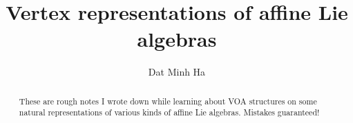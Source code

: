 

\setcounter{section}{-1}


\newcommand{\simpleroots}{\mathbb{I}}



    \title{Vertex representations of affine Lie algebras}
    
    \author{Dat Minh Ha}
    \maketitle
    
    \begin{abstract}
        These are rough notes I wrote down while learning about VOA structures on some natural representations of various kinds of affine Lie algebras. Mistakes guaranteed!
    \end{abstract}
    
    {
    \hypersetup{} 
    \tableofcontents %
    }

    

    

    

    
    
    \printbibliography


